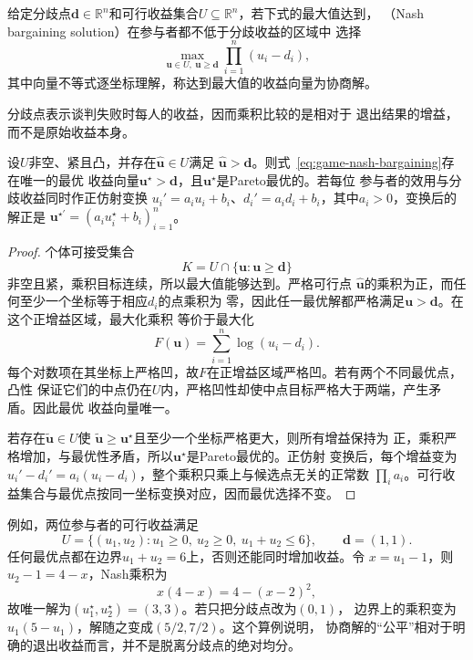 \begin{definition}[Nash乘积协商解]
\label{def:game-nash-bargaining-solution}
给定分歧点\(\bm{d}\in\mathbb R^n\)和可行收益集合\(U\subseteq\mathbb{R}^n\)，若下式的最大值达到，
（Nash bargaining solution）在参与者都不低于分歧收益的区域中
选择
\begin{equation}
  \max_{\bm{u}\in U,\ \bm{u}\geq\bm{d}}
  \prod_{i=1}^{n}(u_i-d_i),
  \label{eq:game-nash-bargaining}
\end{equation}
其中向量不等式逐坐标理解，称达到最大值的收益向量为协商解。
\end{definition}
分歧点表示谈判失败时每人的收益，因而乘积比较的是相对于
退出结果的增益，而不是原始收益本身。

\begin{theorem}
\label{thm:game-nash-bargaining-properties}
设\(U\)非空、紧且凸，并存在\(\widehat{\bm{u}}\in U\)满足
\(\widehat{\bm{u}}>\bm{d}\)。则式~\eqref{eq:game-nash-bargaining}存在唯一的最优
收益向量\(\bm{u}^\star>\bm{d}\)，且\(\bm{u}^\star\)是Pareto最优的。若每位
参与者的效用与分歧收益同时作正仿射变换
\(u_i'=a_i u_i+b_i\)、\(d_i'=a_i d_i+b_i\)，其中\(a_i>0\)，变换后的解正是
\(\bm{u}^{\star\prime}=(a_i u_i^\star+b_i)_{i=1}^n\)。
\end{theorem}

\begin{proof}
个体可接受集合
\[
  K=U\cap\{\bm{u}:\bm{u}\geq\bm{d}\}
\]
非空且紧，乘积目标连续，所以最大值能够达到。严格可行点
\(\widehat{\bm{u}}\)的乘积为正，而任何至少一个坐标等于相应\(d_i\)的点乘积为
零，因此任一最优解都严格满足\(\bm{u}>\bm{d}\)。在这个正增益区域，最大化乘积
等价于最大化
\[
  F(\bm{u})=\sum_{i=1}^{n}\log(u_i-d_i).
\]
每个对数项在其坐标上严格凹，故\(F\)在正增益区域严格凹。若有两个不同最优点，凸性
保证它们的中点仍在\(U\)内，严格凹性却使中点目标严格大于两端，产生矛盾。因此最优
收益向量唯一。

若存在\(\widetilde{\bm{u}}\in U\)使
\(\widetilde{\bm{u}}\geq\bm{u}^\star\)且至少一个坐标严格更大，则所有增益保持为
正，乘积严格增加，与最优性矛盾，所以\(\bm{u}^\star\)是Pareto最优的。正仿射
变换后，每个增益变为
\(u_i'-d_i'=a_i(u_i-d_i)\)，整个乘积只乘上与候选点无关的正常数
\(\prod_i a_i\)。可行收益集合与最优点按同一坐标变换对应，因而最优选择不变。
\end{proof}

例如，两位参与者的可行收益满足
\[
  U=\{(u_1,u_2):u_1\geq0,\ u_2\geq0,\ u_1+u_2\leq6\},
  \qquad
  \bm{d}=(1,1).
\]
任何最优点都在边界\(u_1+u_2=6\)上，否则还能同时增加收益。令
\(x=u_1-1\)，则\(u_2-1=4-x\)，Nash乘积为
\[
  x(4-x)=4-(x-2)^2,
\]
故唯一解为\((u_1^\star,u_2^\star)=(3,3)\)。若只把分歧点改为\((0,1)\)，
边界上的乘积变为\(u_1(5-u_1)\)，解随之变成\((5/2,7/2)\)。这个算例说明，
协商解的“公平”相对于明确的退出收益而言，并不是脱离分歧点的绝对均分。

